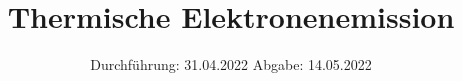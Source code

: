 

\subject{V504}
\title{Thermische Elektronenemission}
\date{%
  Durchführung: 31.04.2022
  \hspace{3em}
  Abgabe: 14.05.2022
}



\maketitle
\thispagestyle{empty}
\tableofcontents
\newpage






\printbibliography{}




